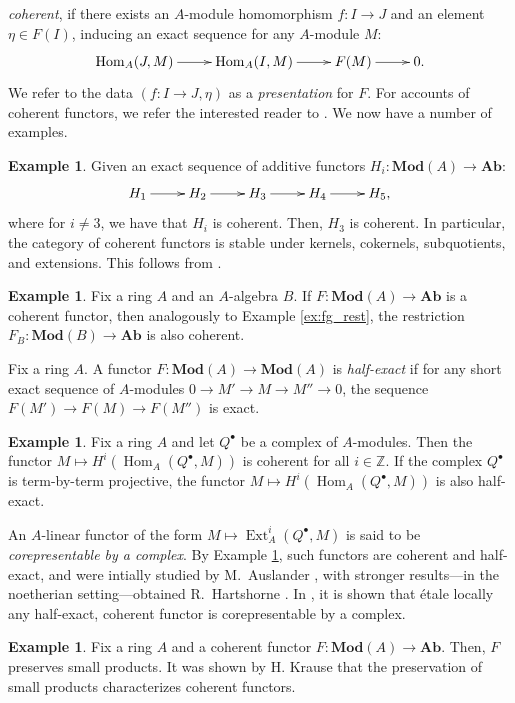 \documentclass{amsart}
\theoremstyle{plain}
\theoremstyle{definition}
\newtheorem{ex}[thm]{Example}
\theoremstyle{remark}
\numberwithin{equation}{section}
\newcommand{\Z}{\mathbb{Z}}
\newcommand{\MOD}[1]{\mathbf{Mod}({#1})}
\DeclareMathOperator{\Hom}{Hom}
\DeclareMathOperator{\Ext}{Ext}
\newcommand{\AB}{\mathbf{Ab}}
\newcommand{\fndefn}[1]{\emph{{#1}}}
\begin{document}
\fndefn{coherent}, if 
there exists an $A$-module homomorphism $f :I \to J$ and an element
$\eta \in F(I)$, inducing an exact sequence for any $A$-module $M$:  
\[
\xymatrix{\Hom_A(J,M) \ar[r] & \Hom_A(I,M) \ar[r] & F(M) \ar[r] & 0. }
\]
We refer to the data $(f : I \to J,\eta)$ as a \fndefn{presentation}
for $F$. For accounts of coherent functors, we refer the
interested reader to \cite{MR0212070,MR1656482}. We now have a number
of examples.  
\begin{ex}\label{ex:coherent_ab}
  Given an exact sequence of additive functors $H_i : \MOD{A} \to
  \AB$:
    \[
   \xymatrix{H_1 \ar[r] & H_2 \ar[r] & H_3 \ar[r] & H_4 \ar[r] & H_5, }
   \]
   where for $i\neq 3$, we have that $H_i$ is coherent. Then, $H_3$ is
   coherent. In particular, the category of coherent functors is stable
   under kernels, cokernels, subquotients, and extensions. This follows from
   \cite[Prop.\ 2.1]{MR0212070}.
\end{ex}
\begin{ex}\label{ex:coh_rest}
  Fix a ring $A$ and an $A$-algebra $B$. If $F : \MOD{A} \to \AB$ is a
  coherent functor, then analogously to Example \ref{ex:fg_rest}, the
  restriction $F_B : \MOD{B} \to \AB$ is also coherent. 
\end{ex}
Fix a ring $A$. A functor $F : \MOD{A} \to \MOD{A}$ is
\fndefn{half-exact} if for any short exact sequence of $A$-modules $0
\to M' \to M \to M'' \to 0$, the sequence $F(M') \to F(M) \to F(M'')$
is exact. 
\begin{ex}\label{ex:cmplx}
  Fix a ring $A$ and let $Q^\bullet$ be a complex of $A$-modules. Then
  the functor $M\mapsto H^i(\Hom_A(Q^\bullet,M))$ is coherent for all
  $i\in \Z$. If the complex $Q^\bullet$ is term-by-term projective,
  the functor $M\mapsto H^i(\Hom_A(Q^\bullet,M))$ is also
  half-exact. 
\end{ex}
An $A$-linear functor of the form $M \mapsto \Ext^i_A(Q^\bullet,M)$ is
said to be \fndefn{corepresentable by a complex}. By Example
\ref{ex:cmplx}, such functors are coherent and half-exact, and were
intially studied by M.~Auslander \cite{MR0212070}, with stronger
results---in the noetherian setting---obtained R.~Hartshorne
\cite{MR1656482}. In \cite{coh_crit_he_func}, it is shown that \'etale
locally any half-exact, coherent functor is corepresentable by a
complex.
\begin{ex}\label{ex:coh_prod}
  Fix a ring $A$ and a coherent functor $F : \MOD{A} \to \AB$. Then,
  $F$ preserves small products. It was shown by H. Krause 
  \cite[Prop.\ 3.2]{MR2026723} that the preservation of small products
  characterizes coherent functors.  
\end{ex}
\end{document}
